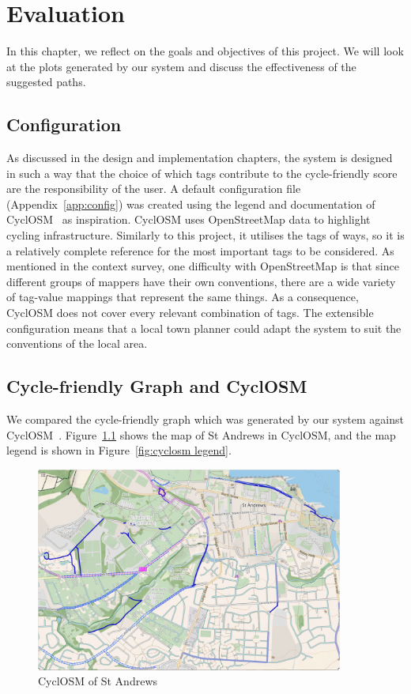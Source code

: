 \documentclass[12pt,a4paper]{report}
\begin{document}
\chapter{Evaluation}\label{chapter:eval}
In this chapter, we reflect on the goals and objectives of this project. We will look at the plots generated by our system and discuss the effectiveness of the suggested paths.

\section{Configuration}
As discussed in the design and implementation chapters, the system is designed in such a way that the choice of which tags contribute to the cycle-friendly score are the responsibility of the user. A default configuration file (Appendix~\ref{app:config}) was created using the legend and documentation of CyclOSM~\cite{cycleOSM} as inspiration. CyclOSM uses OpenStreetMap data to highlight cycling infrastructure. Similarly to this project, it utilises the tags of ways, so it is a relatively complete reference for the most important tags to be considered. As mentioned in the context survey, one difficulty with OpenStreetMap is that since different groups of mappers have their own conventions, there are a wide variety of tag-value mappings that represent the same things. As a consequence, CyclOSM does not cover every relevant combination of tags. The extensible configuration means that a local town planner could adapt the system to suit the conventions of the local area.

\section{Cycle-friendly Graph and CyclOSM}\label{sec:eval_osm}
We compared the cycle-friendly graph which was generated by our system against CyclOSM~\cite{cycleOSM}. Figure~\ref{fig:cyclosm st andrews} shows the map of St Andrews in CyclOSM, and the map legend is shown in Figure~\ref{fig:cyclosm legend}.

\begin{figure}[ht!]
    \centering
    \includegraphics[width=0.9\textwidth]{diss_images/eval/cyclosm_st_andrews.png}
    \caption{CyclOSM of St Andrews}
    \label{fig:cyclosm st andrews}
\end{figure}
\end{document}
